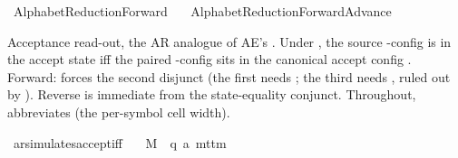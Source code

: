 %
\begin{isabellebody}%
%
%
\isadelimtheory
%
\endisadelimtheory
%
\isatagtheory
{}\isamarkupfalse%
\ AlphabetReduction{\isacharunderscore}{\kern0pt}Forward\isanewline
\ \ \ AlphabetReduction{\isacharunderscore}{\kern0pt}ForwardAdvance\isanewline
{}%
\endisatagtheory
{\isafoldtheory}%
%
\isadelimtheory
%
\endisadelimtheory
%
\isadelimdocument
%
\endisadelimdocument
%
\isatagdocument
%
\isamarkuptrue%
%
\endisatagdocument
{\isafolddocument}%
%
\isadelimdocument
%
\endisadelimdocument
%
\begin{isamarkuptext}%
Acceptance read-out, the AR analogue of AE's
  .  Under , the
  source -config is in the accept state iff the paired
  -config sits in the canonical accept config
  .  Forward: 
  forces the second  disjunct (the first needs
  ; the third needs , ruled
  out by ).  Reverse is immediate from the
  state-equality conjunct.
  Throughout,  abbreviates  (the per-symbol cell width).%
\end{isamarkuptext}\isamarkuptrue%
\isamarkupfalse%
\ ar{\isacharunderscore}{\kern0pt}simulates{\isacharunderscore}{\kern0pt}accept{\isacharunderscore}{\kern0pt}iff{\isacharcolon}{\kern0pt}\isanewline
\ \ \ M\ {\isacharcolon}{\kern0pt}{\isacharcolon}{\kern0pt}\ {\isachardoublequoteopen}{\isacharparenleft}{\kern0pt}{\isacharprime}{\kern0pt}q{\isacharcomma}{\kern0pt}\ {\isacharprime}{\kern0pt}a{\isacharparenright}{\kern0pt}\ mttm{\isachardoublequoteclose}\isanewline

\end{isabellebody}

